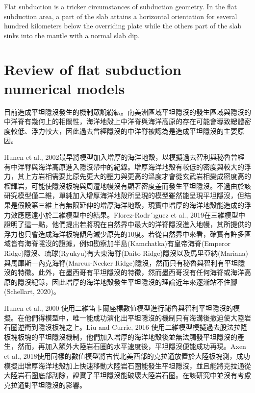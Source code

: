 Flat subduction is a tricker circumstances of subduction geometry. In the flat subduction area, a part of the slab attains a horizontal orientation for several hundred kilometers below the overriding plate while the others part of the slab sinks into the mantle with a normal slab dip.



\section{Review of flat subduction numerical models}

目前造成平坦隱沒發生的機制眾說紛紜。南美洲區域平坦隱沒的發生區域與隱沒的中洋脊有幾何上的相關性，海洋地殼上中洋脊與海洋高原的存在可能會導致總體密度較低、浮力較大，因此過去曾經隱沒的中洋脊被認為是造成平坦隱沒的主要原因。

Hunen et al., 2002最早將模型加入增厚的海洋地殼，以模擬過去智利與秘魯曾經有中洋脊與海洋高原進入隱沒帶中的紀錄。增厚海洋地殼有較低的密度與較大的浮力，其上方岩相需要比原先更大的壓力與更高的溫度才會從玄武岩相變成密度高的榴輝岩，可能使隱沒板塊與周遭地幔沒有顯著密度差而發生平坦隱沒。不過由於該研究模型僅二維，單純加入增厚海洋地殼所呈現的模型雖然能呈現平坦隱沒，但結果是假設第三維上有無限延伸的增厚海洋地殼，現實中增厚的海洋地殼能造成的浮力效應應遠小於二維模型中的結果。Florez-Rodr´ıguez et al., 2019在三維模型中證明了這一點，他們提出若將現在自然界中最大的洋脊隱沒進入地幔，其所提供的浮力也只會造成海洋板塊傾角減少原先的10度。若從自然界中來看，確實有許多區域皆有海脊隱沒的證據，例如勘察加半島(Kamchatka)有皇帝海脊(Emperor Ridge)隱沒、琉球(Ryukyu)有大東海脊(Daito Ridge)隱沒以及馬里亞納(Mariana)與馬庫斯—內克海脊(Marcus-Necker Ridge)隱沒，然而只有秘魯與智利有平坦隱沒的特徵。此外，在墨西哥有平坦隱沒的特徵，然而墨西哥沒有任何海脊或海洋高原的隱沒紀錄，因此增厚的海洋地殼發生平坦隱沒的理論近年來逐漸站不住腳(Schellart, 2020)。

Hunen et al., 2000 使用二維笛卡爾座標數值模型進行祕魯與智利平坦隱沒的模擬。在他們得模型中，唯一能成功演化出平坦隱沒的機制只有海溝後撤迫使大陸岩石圈逆衝到隱沒板塊之上。Liu and Currie, 2016 使用二維模型模擬過去股法拉隆板塊板塊的平坦隱沒機制，他們加入增厚的海洋地殼後並無法觸發平坦隱沒的產生，然而，再加入額外大陸岩石圈的水平速度後，平坦隱沒便能成功再現。Axen et al., 2018使用同樣的數值模型將古代北美西部的克拉通放置於大陸板塊測，成功模擬出增厚海洋地殼加上快速移動大陸岩石圈能發生平坦隱沒，並且能將克拉通從大陸岩石圈底部刮除，證實了平坦隱沒能破壞大陸岩石圈。在該研究中並沒有考慮克拉通對平坦隱沒的影響。

